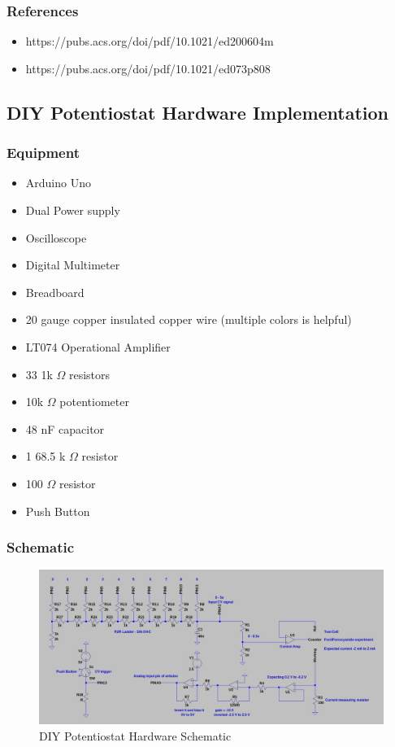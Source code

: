 \documentclass{article}
\begin{document}
\subsubsection*{References}
\begin{itemize}
\item https://pubs.acs.org/doi/pdf/10.1021/ed200604m
\item https://pubs.acs.org/doi/pdf/10.1021/ed073p808
\end{itemize}
\newpage

\subsection*{DIY Potentiostat Hardware Implementation}
\subsubsection*{Equipment}
\begin{itemize}
  \item Arduino Uno
  \item Dual Power supply
  \item Oscilloscope
  \item Digital Multimeter
  \item Breadboard
  \item 20 gauge copper insulated copper wire (multiple colors is helpful)
  \item LT074 Operational Amplifier
  \item 33 1k $\Omega$ resistors
  \item 10k $\Omega$ potentiometer
  \item 48 nF capacitor
  \item 1 68.5 k $\Omega$ resistor 
  \item 100 $\Omega$ resistor
  \item Push Button
\end{itemize}
\subsubsection*{Schematic}
\begin{figure}[H]
  \centering
  \includegraphics[width=1\linewidth]{diy_design.png}
  \caption*{DIY Potentiostat Hardware Schematic}
\end{figure}
\end{document}
